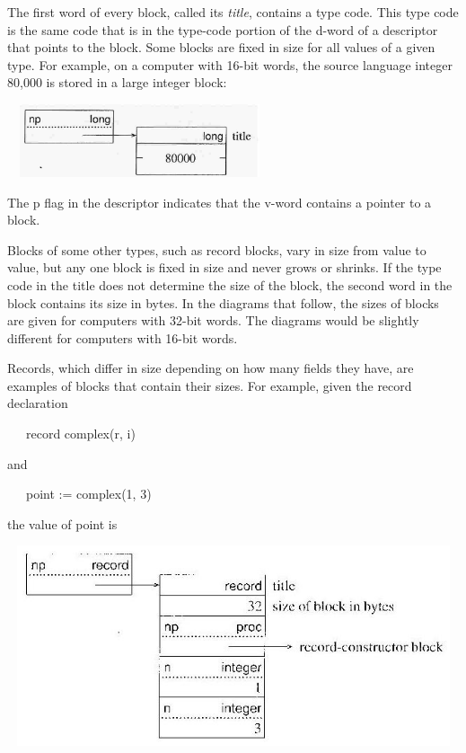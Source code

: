 The first word of every block, called its \textit{title}, contains a
type code. This type code is the same code that is in the type-code
portion of the d-word of a descriptor that points to the block. Some
blocks are fixed in size for all values of a given type. For example,
on a computer with 16-bit words, the source language integer 80,000 is
stored in a large integer block:

\ \  \includegraphics[width=2.778in,height=0.8437in]{ib-img/ib-img010.jpg} 

\noindent The p flag in the descriptor indicates that the v-word
contains a pointer to a block.

Blocks of some other types, such as record blocks, vary in size from
value to value, but any one block is fixed in size and never grows or
shrinks. If the type code in the title does not determine the size of
the block, the second word in the block contains its size in bytes. In
the diagrams that follow, the sizes of blocks are given for computers
with 32-bit words. The diagrams would be slightly different for
computers with 16-bit words.

Records, which differ in size depending on how many fields they have,
are examples of blocks that contain their sizes.  For example, given
the record declaration

{\ttfamily\mdseries
\ \ \ record complex(r, i)}

and

{\ttfamily\mdseries
\ \ \ point := complex(1, 3)}

the value of point is

\begin{center}
\includegraphics[width=5.3098in,height=2.3193in]{ib-img/ib-img011.jpg}
\end{center}

